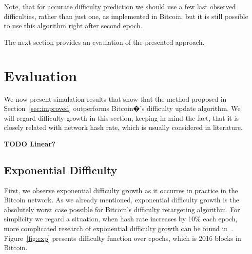 \documentclass[]{llncs}
\begin{document}
Note, that for accurate difficulty prediction we should use a few last observed difficulties, rather than just one, as implemented in Bitcoin, but it is still possible to use this algorithm right after second epoch.



The next section provides an evaulation of the presented approach.

\section{Evaluation}
\label{sec:sim}

We now present simulation results that show that the  method proposed in Section~\ref{sec:improved} outperforms Bitcoin�'s difficulty update algorithm.
We will regard difficulty growth in this section, keeping in mind the fact, that it is closely related with network hash rate, which is usually considered in literature.

\textbf{TODO Linear?}

\subsection{Exponential Difficulty}

First, we observe exponential difficulty growth as it occurres in practice in the Bitcoin network. As we already mentioned, exponential difficulty growth is the absolutely worst case possible for Bitcoin’s difficulty retargeting algorithm.
For simplicity we regard a situation, when hash rate increases by 10\% each epoch, more complicated research of exponential difficulty growth can be found in~\cite{kraft2015difficulty}.
Figure~\ref{fig:exp} presents difficulty function over epochs, which is 2016 blocks in Bitcoin.
\end{document}
